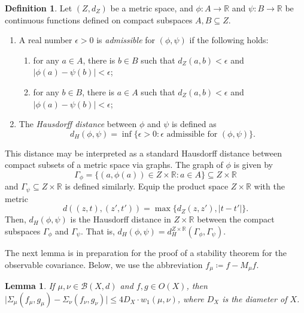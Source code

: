 \documentclass[11pt]{article}
\newtheorem{lemma}[theorem]{Lemma}
\theoremstyle{definition}
\newtheorem{definition}[theorem]{Definition}
\newcommand{\real}{\ensuremath{\mathbb{R}}}
\newcommand{\obs}[1]{\ensuremath{O(#1)}}
\newcommand{\borel}{\ensuremath{\mathcal{B}}}
\begin{document}
\begin{definition} \label{D:hausdorff}
Let $(Z,d_Z)$ be a metric space, and $\phi \colon A \to \real$ and $\psi \colon B \to \real$ be continuous functions defined on compact subspaces $A, B \subseteq Z$. 
\begin{enumerate}
\item A real number $\epsilon >0$ is {\em admissible} for $(\phi,\psi)$ if the following holds:
\begin{enumerate}
\item for any $a \in A$, there is $b \in B$ such that $d_Z(a,b) < \epsilon$ and $|\phi(a)-\psi(b)| < \epsilon$;
\item for any $b \in B$, there is $a \in A$ such that $d_Z(a,b) < \epsilon$ and $|\phi(a)-\psi(b)| < \epsilon$;
\end{enumerate}
\item The {\em Hausdorff distance} between $\phi$ and $\psi$ is defined as
\[
d_H (\phi,\psi) = \inf \{\epsilon>0 \colon \text{$\epsilon$ admissible for $(\phi,\psi)$}\}.
\]
\end{enumerate}
\end{definition}

This distance may be interpreted as a standard Hausdorff distance between compact subsets of a metric space \cite{hsdrff1920} via graphs. The graph of $\phi$ is given by
\begin{equation}
\Gamma_\phi = \{(a,\phi(a)) \in Z \times \real \colon a \in A\} \subseteq Z \times \real
\end{equation}
and $\Gamma_\psi \subseteq Z \times \real$ is defined similarly. Equip the product space $Z \times \real$ with the metric
\begin{equation}
d((z,t), (z',t')) = \max \{d_Z(z,z'), |t-t'|\}.
\end{equation}
Then, $d_H(\phi,\psi)$ is the Hausdorff distance in $Z \times \real$ between the compact subspaces $\Gamma_\phi$ and $\Gamma_\psi$. That is, $d_H (\phi,\psi) = d_H^{Z \times \real} (\Gamma_\phi, \Gamma_\psi)$. 

The next lemma is in preparation for the proof of a stability theorem for the observable covariance. Below, we use the abbreviation $f_\mu \coloneq f - M_\mu f$.

\begin{lemma} \label{L:estimate}
If $\mu, \nu \in \borel (X,d)$ and $f,g \in \obs{X}$, then $\big|\Sigma_\mu (f_\mu , g_\mu ) - \Sigma_\nu (f_\nu , g_\nu )\big| \leq 4 D_X \cdot w_1 (\mu,\nu)$, where $D_X$ is the diameter of $X$.
\end{lemma}
\end{document}

